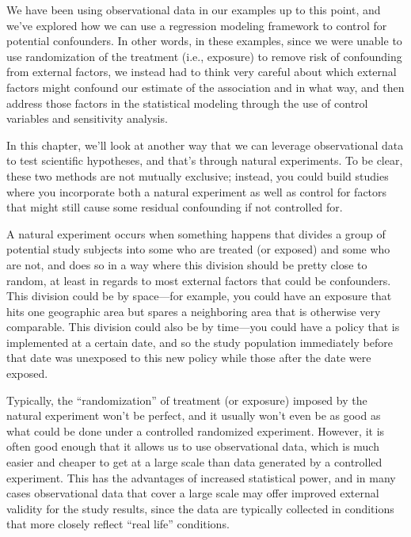 \documentclass[
]{book}
\begin{document}
We have been using observational data in our examples up to this point, and we've explored how we can use a regression modeling framework to control for potential confounders. In other words, in these examples, since we were unable to use randomization of the treatment (i.e., exposure) to remove risk of confounding from external factors, we instead had to think very careful about which external factors might confound our estimate of the association and in what way, and then address those factors in the statistical modeling through the use of control variables and sensitivity analysis.

In this chapter, we'll look at another way that we can leverage observational data to test scientific hypotheses, and that's through natural experiments. To be clear, these two methods are not mutually exclusive; instead, you could build studies where you incorporate both a natural experiment as well as control for factors that might still cause some residual confounding if not controlled for.

A natural experiment occurs when something happens that divides a group of potential study subjects into some who are treated (or exposed) and some who are not, and does so in a way where this division should be pretty close to random, at least in regards to most external factors that could be confounders. This division could be by space---for example, you could have an exposure that hits one geographic area but spares a neighboring area that is otherwise very comparable. This division could also be by time---you could have a policy that is implemented at a certain date, and so the study population immediately before that date was unexposed to this new policy while those after the date were exposed.

Typically, the ``randomization'' of treatment (or exposure) imposed by the natural experiment won't be perfect, and it usually won't even be as good as what could be done under a controlled randomized experiment. However, it is often good enough that it allows us to use observational data, which is much easier and cheaper to get at a large scale than data generated by a controlled experiment. This has the advantages of increased statistical power, and in many cases observational data that cover a large scale may offer improved external validity for the study results, since the data are typically collected in conditions that more closely reflect ``real life'' conditions.
\end{document}

